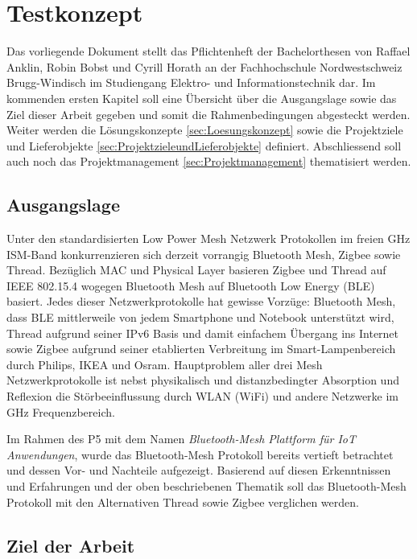 	\clearpage
\section{Testkonzept}\label{sec:Uebersicht}

Das vorliegende Dokument stellt das Pflichtenheft der Bachelorthesen von Raffael Anklin, Robin Bobst und Cyrill Horath an der Fachhochschule Nordwestschweiz Brugg-Windisch im Studiengang Elektro- und Informationstechnik dar. 
Im kommenden ersten Kapitel soll eine Übersicht über die Ausgangslage sowie das Ziel dieser Arbeit gegeben und somit die Rahmenbedingungen abgesteckt werden. Weiter werden die Lösungskonzepte \ref{sec:Loesungskonzept} sowie die Projektziele und Lieferobjekte \ref{sec:ProjektzieleundLieferobjekte} definiert. Abschliessend soll auch noch das Projektmanagement \ref{sec:Projektmanagement} thematisiert werden. 

\subsection{Ausgangslage}\label{subsec:Ausgangslage}

Unter den standardisierten Low Power Mesh Netzwerk Protokollen im
freien GHz ISM-Band konkurrenzieren sich derzeit vorrangig Bluetooth Mesh, Zigbee sowie Thread.
Bezüglich MAC und Physical Layer basieren Zigbee und Thread auf IEEE 802.15.4 wogegen Bluetooth Mesh auf Bluetooth Low Energy (BLE)
basiert.
Jedes dieser Netzwerkprotokolle hat gewisse Vorzüge: Bluetooth Mesh, dass BLE mittlerweile von jedem Smartphone und Notebook unterstützt wird, Thread aufgrund seiner IPv6 Basis und damit einfachem Übergang ins Internet sowie Zigbee aufgrund seiner etablierten Verbreitung im Smart-Lampenbereich durch Philips, IKEA und Osram.
Hauptproblem aller drei Mesh Netzwerkprotokolle ist nebst physikalisch und distanzbedingter Absorption und Reflexion die Störbeeinflussung durch WLAN (WiFi) und andere Netzwerke im GHz Frequenzbereich.

Im Rahmen des P5 mit dem Namen \textit{Bluetooth-Mesh Plattform für IoT Anwendungen}, wurde das Bluetooth-Mesh Protokoll bereits vertieft betrachtet und dessen Vor- und Nachteile aufgezeigt. Basierend auf diesen Erkenntnissen und Erfahrungen und der oben beschriebenen Thematik soll das Bluetooth-Mesh Protokoll mit den Alternativen Thread sowie Zigbee verglichen werden.

\subsection{Ziel der Arbeit}\label{subsec:ZielderArbeit}

